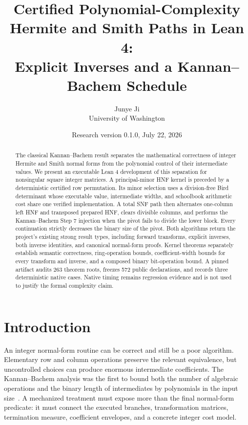 \documentclass[11pt]{article}
\title{Certified Polynomial-Complexity Hermite and Smith Paths in Lean 4:\\
Explicit Inverses and a Kannan--Bachem Schedule}
\author{Junye Ji\\University of Washington}
\date{Research version 0.1.0, July 22, 2026}
\begin{document}
\maketitle

\begin{abstract}
The classical Kannan--Bachem result separates the mathematical correctness of
integer Hermite and Smith normal forms from the polynomial control of their
intermediate values.  We present an executable Lean 4 development of this
separation for nonsingular square integer matrices.  A principal-minor HNF
kernel is preceded by a deterministic certified row permutation.  Its minor
selection uses a division-free Bird determinant whose executable value,
intermediate widths, and schoolbook arithmetic cost share one verified
implementation.  A total SNF path then alternates one-column left HNF and
transposed prepared HNF, clears divisible columns, and performs the
Kannan--Bachem Step 7 injection when the pivot fails to divide the lower
block.  Every continuation strictly decreases the binary size of the pivot.
Both algorithms return the project's existing strong result types, including
forward transforms, explicit inverses, both inverse identities, and canonical
normal-form proofs.  Kernel theorems separately establish semantic
correctness, ring-operation bounds, coefficient-width bounds for every
transform and inverse, and a composed binary bit-operation bound.  A pinned
artifact audits 263 theorem roots, freezes 572 public declarations, and
records three deterministic native cases.  Native timing remains regression
evidence and is not used to justify the formal complexity claim.
\end{abstract}

\section{Introduction}

An integer normal-form routine can be correct and still be a poor algorithm.
Elementary row and column operations preserve the relevant equivalence, but
uncontrolled choices can produce enormous intermediate coefficients.  The
Kannan--Bachem analysis was the first to bound both the number of algebraic
operations and the binary length of intermediates by polynomials in the input
size~\citep[pp. 499--505]{kannanBachem1979}.  A mechanized treatment must expose more
than the final normal-form predicate: it must connect the executed branches,
transformation matrices, termination measure, coefficient envelopes, and a
concrete integer cost model.
\end{document}
